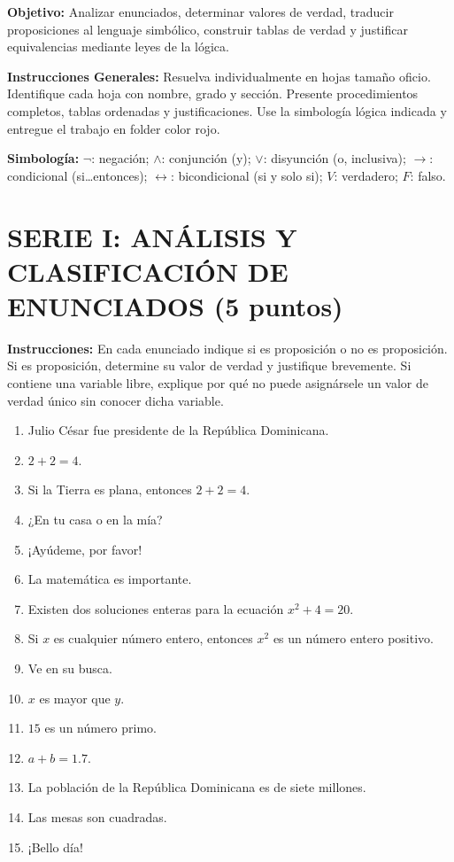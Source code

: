 \documentclass[11pt, letterpaper]{article}
\begin{document}
\vspace{0.15cm}
\noindent
\textbf{Objetivo:} Analizar enunciados, determinar valores de verdad, traducir proposiciones al lenguaje simbólico, construir tablas de verdad y justificar equivalencias mediante leyes de la lógica.

\vspace{0.1cm}
\noindent
\textbf{Instrucciones Generales:} Resuelva individualmente en hojas tamaño oficio. Identifique cada hoja con nombre, grado y sección. Presente procedimientos completos, tablas ordenadas y justificaciones. Use la simbología lógica indicada y entregue el trabajo en folder color rojo.

\vspace{0.1cm}
\noindent
\textbf{Simbología:} $\neg$: negación; $\land$: conjunción (y); $\lor$: disyunción (o, inclusiva); $\rightarrow$: condicional (si\dots entonces); $\leftrightarrow$: bicondicional (si y solo si); $V$: verdadero; $F$: falso.

\vspace{0.2cm}

\section*{\color{AzulMontano} SERIE I: ANÁLISIS Y CLASIFICACIÓN DE ENUNCIADOS (5 puntos)}
\noindent \textbf{Instrucciones:} En cada enunciado indique si es proposición o no es proposición. Si es proposición, determine su valor de verdad y justifique brevemente. Si contiene una variable libre, explique por qué no puede asignársele un valor de verdad único sin conocer dicha variable.

\begin{enumerate}[label=\textbf{\arabic*.}, itemsep=0.25cm]
    \item Julio César fue presidente de la República Dominicana.
    \item $2 + 2 = 4$.
    \item Si la Tierra es plana, entonces $2 + 2 = 4$.
    \item ¿En tu casa o en la mía?
    \item ¡Ayúdeme, por favor!
    \item La matemática es importante.
    \item Existen dos soluciones enteras para la ecuación $x^2 + 4 = 20$.
    \item Si $x$ es cualquier número entero, entonces $x^2$ es un número entero positivo.
    \item Ve en su busca.
    \item $x$ es mayor que $y$.
    \item $15$ es un número primo.
    \item $a + b = 1.7$.
    \item La población de la República Dominicana es de siete millones.
    \item Las mesas son cuadradas.
    \item ¡Bello día!
\end{enumerate}
\end{document}
